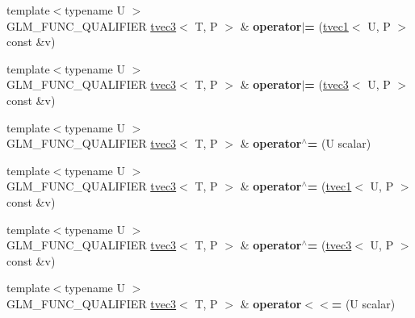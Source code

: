 \begin{DoxyCompactItemize}
{\footnotesize template$<$typename U $>$ }\\G\+L\+M\+\_\+\+F\+U\+N\+C\+\_\+\+Q\+U\+A\+L\+I\+F\+I\+ER \hyperlink{structglm_1_1tvec3}{tvec3}$<$ T, P $>$ \& {\bfseries operator$\vert$=} (\hyperlink{structglm_1_1tvec1}{tvec1}$<$ U, P $>$ const \&v)
\item 
\mbox{\label{structglm_1_1tvec3_ad176614ebae121c5efbb4a28c29080ef}} 
{\footnotesize template$<$typename U $>$ }\\G\+L\+M\+\_\+\+F\+U\+N\+C\+\_\+\+Q\+U\+A\+L\+I\+F\+I\+ER \hyperlink{structglm_1_1tvec3}{tvec3}$<$ T, P $>$ \& {\bfseries operator$\vert$=} (\hyperlink{structglm_1_1tvec3}{tvec3}$<$ U, P $>$ const \&v)
\item 
\mbox{\label{structglm_1_1tvec3_a2cde30e231cec7c356125b3fa4b7fe31}} 
{\footnotesize template$<$typename U $>$ }\\G\+L\+M\+\_\+\+F\+U\+N\+C\+\_\+\+Q\+U\+A\+L\+I\+F\+I\+ER \hyperlink{structglm_1_1tvec3}{tvec3}$<$ T, P $>$ \& {\bfseries operator$^\wedge$=} (U scalar)
\item 
\mbox{\label{structglm_1_1tvec3_a03040ddfeb97c166a0f6e4888f4f75fe}} 
{\footnotesize template$<$typename U $>$ }\\G\+L\+M\+\_\+\+F\+U\+N\+C\+\_\+\+Q\+U\+A\+L\+I\+F\+I\+ER \hyperlink{structglm_1_1tvec3}{tvec3}$<$ T, P $>$ \& {\bfseries operator$^\wedge$=} (\hyperlink{structglm_1_1tvec1}{tvec1}$<$ U, P $>$ const \&v)
\item 
\mbox{\label{structglm_1_1tvec3_aaf5a7e57c8fe6292695624a42b69c339}} 
{\footnotesize template$<$typename U $>$ }\\G\+L\+M\+\_\+\+F\+U\+N\+C\+\_\+\+Q\+U\+A\+L\+I\+F\+I\+ER \hyperlink{structglm_1_1tvec3}{tvec3}$<$ T, P $>$ \& {\bfseries operator$^\wedge$=} (\hyperlink{structglm_1_1tvec3}{tvec3}$<$ U, P $>$ const \&v)
\item 
\mbox{\label{structglm_1_1tvec3_adf4b78d96e7c46c98751a39d26d6822d}} 
{\footnotesize template$<$typename U $>$ }\\G\+L\+M\+\_\+\+F\+U\+N\+C\+\_\+\+Q\+U\+A\+L\+I\+F\+I\+ER \hyperlink{structglm_1_1tvec3}{tvec3}$<$ T, P $>$ \& {\bfseries operator$<$$<$=} (U scalar)
\item 
\mbox{\label{structglm_1_1tvec3_a3eadadf25a3ef2e34bb1b6b7f192384a}} 

\end{DoxyCompactItemize}
